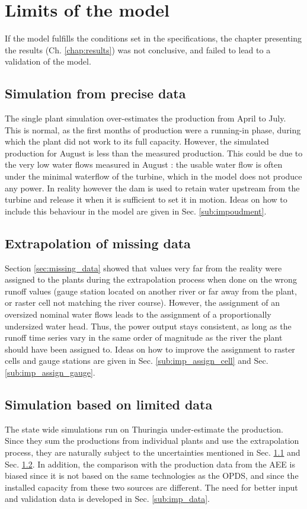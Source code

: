 \section{Limits of the model}
\label{sec:limits}
If the model fulfills the conditions set in the specifications, the chapter presenting the results (Ch. \ref{chap:results}) was not conclusive, and failed to lead to a validation of the model.
\subsection{Simulation from precise data}
\label{sub:lim_single}
The single plant simulation over-estimates the production from April to July. This is normal, as the first months of production were a running-in phase, during which the plant did not work to its full capacity. However, the simulated production for August is less than the measured production. This could be due to the very low water flows measured in August : the usable water flow is often under the minimal waterflow of the turbine, which in the model does not produce any power. In reality however the dam is used to retain water upstream from the turbine and release it when it is sufficient to set it in motion. Ideas on how to include this behaviour in the model are given in Sec. \ref{sub:impoudment}.

\subsection{Extrapolation of missing data}
\label{sub:lim_extra}
Section \ref{sec:missing_data} showed that values very far from the reality were assigned to the plants during the extrapolation process when done on the wrong runoff values (gauge station located on another river or far away from the plant, or raster cell not matching the river course). However, the assignment of an oversized nominal water flows leads to the assignment of a proportionally undersized water head. Thus, the power output stays consistent, as long as the runoff time series vary in the same order of magnitude as the river the plant should have been assigned to. Ideas on how to improve the assignment to raster cells and gauge stations are given in Sec. \ref{sub:imp_assign_cell} and Sec. \ref{sub:imp_assign_gauge}.

\subsection{Simulation based on limited data}
\label{sub:lim_data}
The state wide simulations run on Thuringia under-estimate the production. Since they sum the productions from individual plants and use the extrapolation process, they are naturally subject to the uncertainties mentioned in Sec. \ref{sub:lim_single} and Sec. \ref{sub:lim_extra}. In addition, the comparison with the production data from the AEE is biased since it is not based on the same technologies as the OPDS, and since the installed capacity from these two sources are different. The need for better input and validation data is developed in Sec. \ref{sub:imp_data}.

